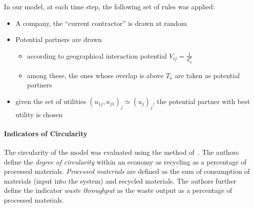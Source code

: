 \documentclass[fleqn,10pt]{wlscirep}
\begin{document}
In our model, at each time step, the following set of rules was applied:
\begin{itemize}
\item A company, the ``current contractor'' is drawn at random %
\item Potential partners are drawn
\begin{itemize}
\item according to geographical interaction potential $V_{ij}=\frac{1}{d_{ij}^{\alpha}}$
\item among these, the ones whose overlap is above $T_o$ are taken as potential partners
\end{itemize}
\item given the set of utilities $(u_{1j},u_{j1})_j \simeq (u_j)_j$, the potential partner with best utility is chosen
\end{itemize}




\paragraph*{Indicators of Circularity}


The circularity of the model was evaluated using the method of~\cite{haas2015circular}. The authors define the \textit{degree of circularity} within an economy as recycling as a percentage of processed materials. \textit{Processed materials} are defined as the sum of consumption of materials (input into the system) and recycled materials. The authors further define the indicator \textit{waste throughput} as the waste output as a percentage of processed materials. 
\end{document}
